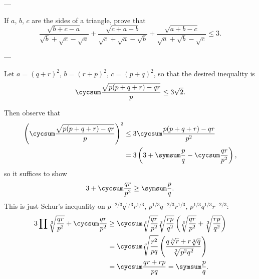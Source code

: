 
---

If $a$, $b$, $c$ are the sides of a triangle, prove that
\[\frac{\sqrt{b+c-a}}{\sqrt b+\sqrt c-\sqrt a}+\frac{\sqrt{c+a-b}}{\sqrt c+\sqrt a-\sqrt b}+\frac{\sqrt{a+b-c}}{\sqrt a+\sqrt b-\sqrt c}\le3.\]

---

Let $a=(q+r)^2$, $b=(r+p)^2$, $c=(p+q)^2$, so that the desired inequality is
\[\cycsum\frac{\sqrt{p(p+q+r)-qr}}p\le3\sqrt2.\]

Then observe that
\begin{align*}
\left(\cycsum\frac{\sqrt{p(p+q+r)-qr}}p\right)^2
&\le3\cycsum\frac{p(p+q+r)-qr}{p^2}\\
&=3\left(3+\symsum\frac pq-\cycsum\frac{qr}{p^2}\right),
\end{align*}
so it suffices to show
\[3+\cycsum\frac{qr}{p^2}\ge\symsum\frac pq.\]
This is just Schur's inequality on $p^{-2/3}q^{1/3}r^{1/3}$, $p^{1/3}q^{-2/3}r^{1/3}$, $p^{1/3}q^{1/3}r^{-2/3}$:
\begin{align*}
    3\prod\sqrt[3]{\frac{qr}{p^2}}+\cycsum\frac{qr}{p^2}
    &\ge\cycsum\sqrt[3]{\frac{qr}{p^2}}\sqrt[3]{\frac{rp}{q^2}}\left(\sqrt[3]{\frac{qr}{p^2}}+\sqrt[3]{\frac{rp}{q^2}}\right)\\
    &=\cycsum\sqrt[3]{\frac{r^2}{pq}}\left(\frac{q\sqrt[3]r+r\sqrt[3]q}{\sqrt[3]{p^2q^2}}\right)\\
    &=\cycsum\frac{qr+rp}{pq}=\symsum\frac pq.
\end{align*}


